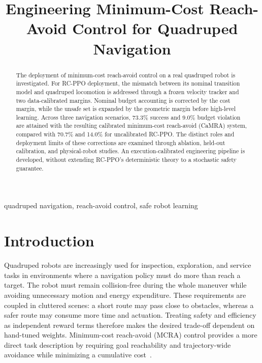 \documentclass[conference]{IEEEtran}
\title{Engineering Minimum-Cost Reach-Avoid Control for Quadruped Navigation}
\author{
  \IEEEauthorblockN{Anonymous Author(s)}
  \IEEEauthorblockA{\textit{Affiliation}\\
  Address\\
  \texttt{email}}
}
\begin{document}
\raggedbottom
\maketitle

\begin{abstract}
The deployment of minimum-cost reach-avoid control on a real quadruped robot is investigated. For RC-PPO deployment, the mismatch between its nominal transition model and quadruped locomotion is addressed through a frozen velocity tracker and two data-calibrated margins. Nominal budget accounting is corrected by the cost margin, while the unsafe set is expanded by the geometric margin before high-level learning. Across three navigation scenarios, 73.3\% success and 9.0\% budget violation are attained with the resulting calibrated minimum-cost reach-avoid (CaMRA) system, compared with 70.7\% and 14.0\% for uncalibrated RC-PPO. The distinct roles and deployment limits of these corrections are examined through ablation, held-out calibration, and physical-robot studies. An execution-calibrated engineering pipeline is developed, without extending RC-PPO's deterministic theory to a stochastic safety guarantee.
\end{abstract}

\begin{IEEEkeywords}
quadruped navigation, reach-avoid control, safe robot learning
\end{IEEEkeywords}

\section{Introduction}
Quadruped robots are increasingly used for inspection, exploration, and service
tasks in environments where a navigation policy must do more than reach a target.
The robot must remain collision-free during the whole maneuver while avoiding
unnecessary motion and energy expenditure. These requirements are coupled in
cluttered scenes: a short route may pass close to obstacles, whereas a safer route
may consume more time and actuation. Treating safety and efficiency as independent
reward terms therefore makes the desired trade-off dependent on hand-tuned weights.
Minimum-cost reach-avoid (MCRA) control provides a more direct task description by
requiring goal reachability and trajectory-wide avoidance while minimizing a
cumulative cost~\cite{bansal2017,ganai2024survey}.
\end{document}
